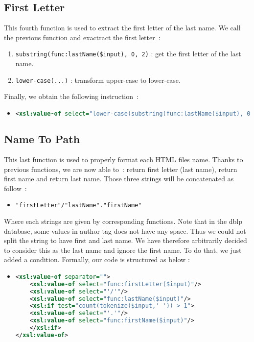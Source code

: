 \documentclass{article}
\begin{document}
  \subsection{First Letter}
    This fourth function is used to extract the first letter of the last name. We call the previous function and exactract the first letter~:
    \begin{enumerate}
      \item \verb|substring(func:lastName($input), 0, 2)| : get the first letter of the last name.
      \item \verb|lower-case(...)| : transform upper-case to lower-case.
    \end{enumerate}
    Finally, we obtain the following instruction~:
    \begin{itemize}
      \item \begin{lstlisting}[language=XML]
<xsl:value-of select="lower-case(substring(func:lastName($input), 0, 2))" />\end{lstlisting}
    \end{itemize}

  \subsection{Name To Path} 
    This last function is used to properly format each HTML files name. Thanks to previous functions, we are now able to~: return first letter (last name), return first name and return last name. Those three strings will be concatenated as follow~: 
    \begin{itemize}
      \item \verb|"firstLetter"/"lastName"."firstName"|
    \end{itemize}
    Where each strings are given by corresponding functions. Note that in the dblp database, some values in author tag does not have any space. Thus we could not split the string to have first and last name. We have therefore arbitrarily decided to consider this as the last name and ignore the first name. To do that, we just added a condition.  Formally, our code is structured as below : 
    \begin{itemize}
    \item \begin{lstlisting}[language=XML]
<xsl:value-of separator="">
    <xsl:value-of select="func:firstLetter($input)"/>
    <xsl:value-of select="'/'"/>
    <xsl:value-of select="func:lastName($input)"/>
    <xsl:if test="count(tokenize($input,' ')) > 1">
	<xsl:value-of select="'.'"/>
	<xsl:value-of select="func:firstName($input)"/>
    </xsl:if>
</xsl:value-of>\end{lstlisting}
    \end{itemize}
\end{document}
